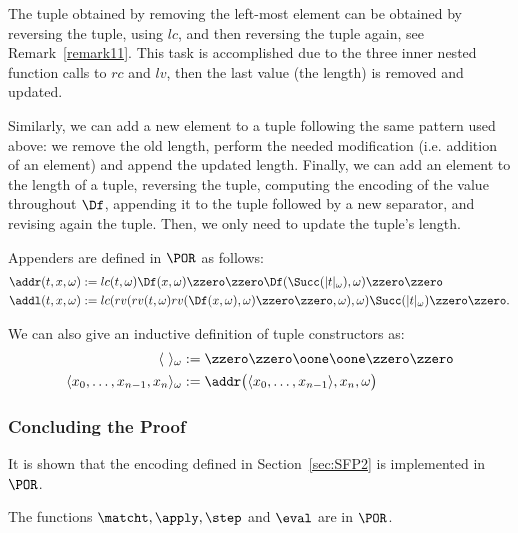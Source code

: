 The tuple obtained by removing the left-most
element can be obtained by reversing
the tuple, using $lc$, and then reversing
the tuple again, see Remark~\ref{remark11}.
This task is accomplished due to
the three inner nested function
calls to $rc$ and $lv$, then the last
value (the length) is removed
{and updated}.

Similarly, we can add
a new element to a tuple following
the same pattern used above:
we remove the old length, perform
the needed modification (i.e. addition
of an element) and append the
updated length.
Finally, we can add an element to the
length of a tuple, reversing the tuple,
computing the encoding
of the value throughout
$\Df$, appending it to the tuple
followed by a new separator, and
revising again the tuple.
Then, we only need to update
the tuple's length.

\begin{defn}[Appenders]
Appenders are defined in $\POR$
as follows:
\begin{align*}
\addr(t,x,\omega) &:=
lc(t,\omega)\Df(x,\omega)
\zzero\zzero\Df({\Succ}(
|t|_\omega),\omega)\zzero\zzero \\
%
\addl(t,x,\omega)
&:=
lc(rv(rv(t,\omega)rv(\Df(x,\omega),\omega)
\zzero\zzero,\omega),\omega) {\Succ}
(|t|_\omega)\zzero\zzero.
\end{align*}
\end{defn}
%
%
We can also give an inductive definition
of tuple constructors as:
\begin{align*}
\langle \ \rangle_\omega &:= \zzero\zzero\oone
\oone \zzero\zzero \\
%
\langle x_0,\dots, x_{n-1},x_n\rangle_\omega
&:=
{\addr\big(\langle x_0,\dots, x_{n-1}
\rangle,x_n,\omega\big)}
\end{align*}














\subsubsection{Concluding the Proof}\label{sec:SFPmain1}
{It is shown that the
encoding defined in Section~\ref{sec:SFP2}
is implemented in $\POR$.}

\begin{lemma}\label{lemma:SFP5}
The functions $\matcht, \apply,
\step$ and $\eval$
are in $\POR$.
\end{lemma}

